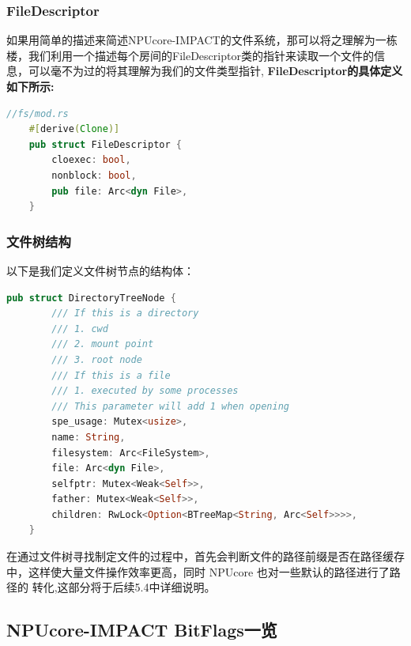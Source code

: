 \subsubsection{FileDescriptor}

如果用简单的描述来简述NPUcore-IMPACT的文件系统，那可以将之理解为一栋楼，我们利用一个描述每个房间的FileDescriptor类的指针来读取一个文件的信息，可以毫不为过的将其理解为我们的文件类型指针, \textbf{FileDescriptor的具体定义如下所示:}

\begin{lstlisting}[language={rust}, label={code:refill}, caption={FileDescriptor}]
    //fs/mod.rs
    #[derive(Clone)]
    pub struct FileDescriptor {
        cloexec: bool,
        nonblock: bool,
        pub file: Arc<dyn File>,
    }
\end{lstlisting}

\subsubsection{文件树结构}

以下是我们定义文件树节点的结构体：

\begin{lstlisting}[language={rust}, label={code:refill}, caption={FileDescriptor}]
    pub struct DirectoryTreeNode {
        /// If this is a directory
        /// 1. cwd
        /// 2. mount point
        /// 3. root node
        /// If this is a file
        /// 1. executed by some processes
        /// This parameter will add 1 when opening
        spe_usage: Mutex<usize>,
        name: String,
        filesystem: Arc<FileSystem>,
        file: Arc<dyn File>,
        selfptr: Mutex<Weak<Self>>,
        father: Mutex<Weak<Self>>,
        children: RwLock<Option<BTreeMap<String, Arc<Self>>>>,
    }
\end{lstlisting}

在通过文件树寻找制定文件的过程中，首先会判断文件的路径前缀是否在路径缓存
中，这样使大量文件操作效率更高，同时 NPUcore 也对一些默认的路径进行了路径的
转化,这部分将于后续5.4中详细说明。

\subsection{NPUcore-IMPACT BitFlags一览}

